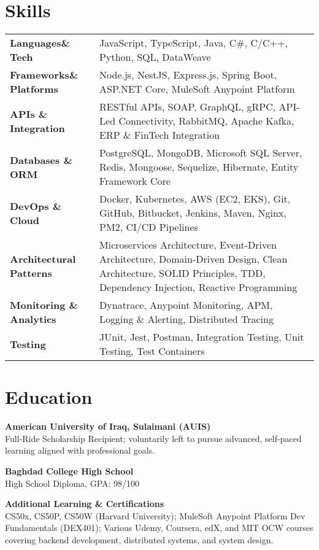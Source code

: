 \documentclass[11pt]{article}
\begin{document}
\section*{Skills}
\begin{tabular}{p{3cm} p{11cm}}
{\textbf{Languages\& Tech}} & JavaScript, TypeScript, Java, C\#, C/C++, Python, SQL, DataWeave\\
{\textbf{Frameworks\& Platforms}} & Node.js, NestJS, Express.js, Spring Boot, ASP.NET Core, MuleSoft Anypoint Platform\\
{\textbf{APIs \& Integration}} & RESTful APIs, SOAP, GraphQL, gRPC, API-Led Connectivity, RabbitMQ, Apache Kafka, ERP \& FinTech Integration\\
{\textbf{Databases \& ORM}} & PostgreSQL, MongoDB, Microsoft SQL Server, Redis, Mongoose, Sequelize, Hibernate, Entity Framework Core\\
{\textbf{DevOps \& Cloud}} & Docker, Kubernetes, AWS (EC2, EKS), Git, GitHub, Bitbucket, Jenkins, Maven, Nginx, PM2, CI/CD Pipelines\\
{\textbf{Architectural Patterns}} & Microservices Architecture, Event-Driven Architecture, Domain-Driven Design, Clean Architecture, SOLID Principles, TDD, Dependency Injection, Reactive Programming\\
{\textbf{Monitoring \& Analytics}} & Dynatrace, Anypoint Monitoring, APM, Logging \& Alerting, Distributed Tracing\\
{\textbf{Testing}} & JUnit, Jest, Postman, Integration Testing, Unit Testing, Test Containers
\end{tabular}

\section*{Education}
\textbf{American University of Iraq, Sulaimani (AUIS)}\\
Full-Ride Scholarship Recipient; voluntarily left to pursue advanced, self-paced learning aligned with professional goals.

\textbf{Baghdad College High School}\\
High School Diploma, GPA: 98/100

\textbf{Additional Learning \& Certifications}\\
CS50x, CS50P, CS50W (Harvard University); MuleSoft Anypoint Platform Dev Fundamentals (DEX401); Various Udemy, Coursera, edX, and MIT OCW courses covering backend development, distributed systems, and system design.
\end{document}
